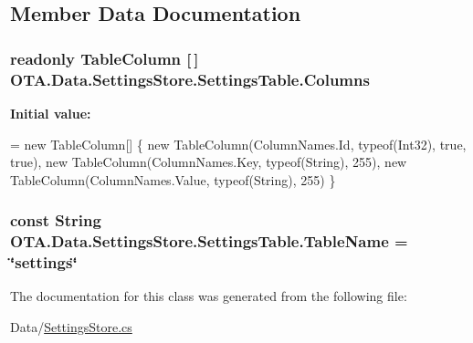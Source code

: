 \subsection{Member Data Documentation}
\hypertarget{class_o_t_a_1_1_data_1_1_settings_store_1_1_settings_table_a96a47fd95d2b48e0ac35cb672846457c}{}
\subsubsection[{Columns}]{\setlength{\rightskip}{0pt plus 5cm}readonly {\bf Table\+Column} \mbox{[}$\,$\mbox{]} O\+T\+A.\+Data.\+Settings\+Store.\+Settings\+Table.\+Columns\hspace{0.3cm}{\ttfamily [static]}}\label{class_o_t_a_1_1_data_1_1_settings_store_1_1_settings_table_a96a47fd95d2b48e0ac35cb672846457c}
{\bfseries Initial value\+:}
\begin{DoxyCode}
= \textcolor{keyword}{new} TableColumn[]
            \{
                \textcolor{keyword}{new} TableColumn(ColumnNames.Id, typeof(Int32), \textcolor{keyword}{true}, \textcolor{keyword}{true}),
                \textcolor{keyword}{new} TableColumn(ColumnNames.Key, typeof(String), 255),
                \textcolor{keyword}{new} TableColumn(ColumnNames.Value, typeof(String), 255)
            \}
\end{DoxyCode}
\hypertarget{class_o_t_a_1_1_data_1_1_settings_store_1_1_settings_table_a8c045c191f61d6ac4ab5680620d4de74}{}
\subsubsection[{Table\+Name}]{\setlength{\rightskip}{0pt plus 5cm}const String O\+T\+A.\+Data.\+Settings\+Store.\+Settings\+Table.\+Table\+Name = \char`\"{}settings\char`\"{}}\label{class_o_t_a_1_1_data_1_1_settings_store_1_1_settings_table_a8c045c191f61d6ac4ab5680620d4de74}


The documentation for this class was generated from the following file\+:\begin{DoxyCompactItemize}
\item 
Data/\hyperlink{_settings_store_8cs}{Settings\+Store.\+cs}\end{DoxyCompactItemize}
